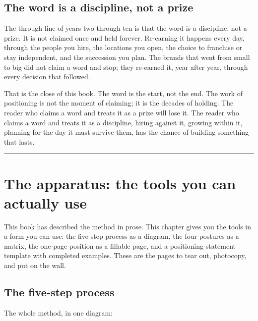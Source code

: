 \documentclass[10pt,twoside,openany]{memoir}
\newcommand{\needspacehead}{\needspace{4\baselineskip}}
\let\oldsection\section
\renewcommand{\section}{\needspacehead\oldsection}
\begin{document}
{{\section{The word is a discipline, not a
prize}\label{the-word-is-a-discipline-not-a-prize}

The through-line of years two through ten is that the word is a
discipline, not a prize. It is not claimed once and held forever.
Re-earning it happens every day, through the people you hire, the
locations you open, the choice to franchise or stay independent, and the
succession you plan. The brands that went from small to big did not
claim a word and stop; they re-earned it, year after year, through every
decision that followed.

That is the close of this book. The word is the start, not the end. The
work of positioning is not the moment of claiming; it is the decades of
holding. The reader who claims a word and treats it as a prize will lose
it. The reader who claims a word and treats it as a discipline, hiring
against it, growing within it, planning for the day it must survive
them, has the chance of building something that lasts.

\begin{center}\rule{0.5\linewidth}{0.5pt}\end{center}

\FloatBarrier
\chapter{The apparatus: the tools you can actually
use}\label{the-apparatus-the-tools-you-can-actually-use}

This book has described the method in prose. This chapter gives you the
tools in a form you can use: the five-step process as a diagram, the
four postures as a matrix, the one-page position as a fillable page, and
a positioning-statement template with completed examples. These are the
pages to tear out, photocopy, and put on the wall.

\section{The five-step process}\label{the-five-step-process}

The whole method, in one diagram:

}}
\end{document}

